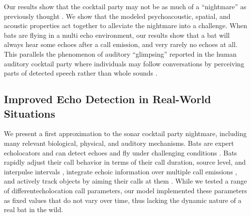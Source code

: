 \documentclass[
]{book}
\begin{document}
Our results show that the cocktail party may not be as much of a ``nightmare'' as previously thought \citep{ulanovsky2008a}. We show that the modeled psychoacoustic, spatial, and acoustic properties act together to alleviate the nightmare into a challenge. When bats are flying in a multi echo environment, our results show that a bat will always hear some echoes after a call emission, and very rarely no echoes at all. This parallels the phenomenon of auditory ``glimpsing'' reported in the human auditory cocktail party where individuals may follow conversations by perceiving parts of detected speech rather than whole sounds \citep{miller1950a}.

\hypertarget{improved-echo-detection-in-real-world-situations}{%
\subsection{Improved Echo Detection in Real-World Situations}\label{improved-echo-detection-in-real-world-situations}}

We present a first approximation to the sonar cocktail party nightmare, including many relevant biological, physical, and auditory mechanisms. Bats are expert echolocators and can detect echoes and fly under challenging conditions \citep{m1989a, surlykke1992target, petrites2009a, bates2008a}. Bats rapidly adjust their call behavior in terms of their call duration, source level, and interpulse intervals \citep{luo2017a, corcoran2017a}, integrate echoic information over multiple call emissions \citep{simmons2012biosonar}, and actively track objects by aiming their calls at them \citep{ghose2006a, ghose2006b}. While we tested a range of differentecholocation call parameters, our model implemented these parameters as fixed values that do not vary over time, thus lacking the dynamic nature of a real bat in the wild.
\end{document}
